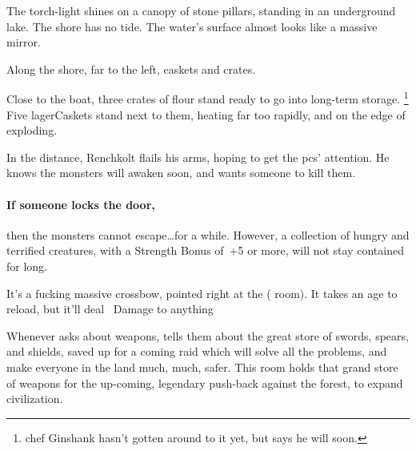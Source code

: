 \begin{multicols}{2}
\begin{boxtext}
  The \gls{torch}-light shines on a canopy of stone pillars, standing in an underground lake.
  The shore has no tide.
  The water's surface almost looks like a massive mirror.

  Along the shore, far to the left, caskets and crates.
\end{boxtext}

Close to the boat, three crates of \gls{flour} stand ready to go into long-term storage.%
\footnote{\Gls{chef} Ginshank hasn't gotten around to it yet, but says he will soon.}
Five \glspl{lagerCasket} stand next to them, heating far too rapidly, and on the edge of exploding.




In the distance, Renchkolt flails his arms, hoping to get the \glspl{pc}' attention.
He knows the \glspl{monster} will awaken soon, and wants someone to kill them.


\paragraph{If someone locks the door,}
then the \glspl{monster} cannot escape\ldots for a while.
However, a collection of hungry and terrified creatures, with a Strength Bonus of~+5 or more, will not stay contained for long.


It's a fucking massive crossbow, pointed right at the  ( room).
It takes an age to reload, but it'll deal ~Damage to anything


\begin{exampletext}
  Whenever  asks about \glspl{weapon},  tells them about the great store of swords, spears, and shields, saved up for a coming raid which will solve all the problems, and make everyone in the land much, much, safer.
  This room holds that grand store of weapons for the up-coming, legendary push-back against the forest, to expand civilization.
\end{exampletext}


\end{multicols}
